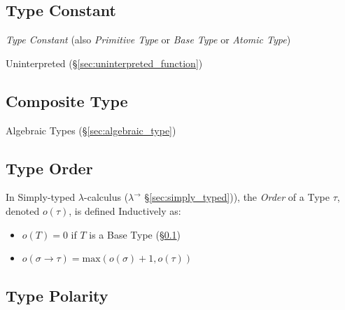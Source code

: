 \subsection{Type Constant}\label{sec:type_constant}

\emph{Type Constant} (also \emph{Primitive Type} or \emph{Base Type}
or \emph{Atomic Type})

Uninterpreted (\S\ref{sec:uninterpreted_function}) %



\subsection{Composite Type}\label{sec:composite_type}

Algebraic Types (\S\ref{sec:algebraic_type})



\subsection{Type Order}\label{sec:type_order}

In Simply-typed $\lambda$-calculus ($\lambda^\rightarrow$
\S\ref{sec:simply_typed})), the \emph{Order} of a Type $\tau$, denoted
$o(\tau)$, is defined Inductively as:
\begin{itemize}
\item $o(T) = 0$ if $T$ is a Base Type (\S\ref{sec:type_constant})
\item $o(\sigma \rightarrow \tau) = \text{max}(o(\sigma) + 1,
  o(\tau))$
\end{itemize}



\subsection{Type Polarity}\label{sec:type_polarity}

